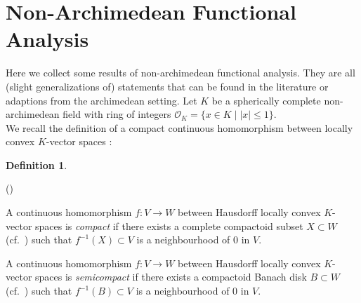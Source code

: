 \documentclass[a4paper, reqno, 10pt]{amsart}
\theoremstyle{definition}
\newtheorem{definition}[theorem]{Definition}
\newenvironment{altenumerate}
	{\begin{list}
		{\textup{(\theenumi)} }
		{\usecounter{enumi}
			\setlength{\labelwidth}{0pt}
			\setlength{\labelsep}{0pt}
			\setlength{\leftmargin}{0pt}
			\setlength{\itemsep}{0pt}
			\setlength{\topsep}{0pt}
		\renewcommand{\theenumi}{\roman{enumi}}
		}}
	{\end{list}}
\numberwithin{equation}{section}
\newcommand{\abs}[1]{{\lvert{#1}\rvert}}
\newcommand{\botimes}[1]{{\,\otimes_{#1}\,}}
\newcommand{\cotimes}[1]{{\,\widehat{\otimes}_{#1}\,}}
\newcommand{\Ind}{{\mathrm{Ind}}}
\newcommand{\lra}{\longrightarrow}
\newcommand{\ra}{\rightarrow}
\newcommand{\BN}{{\mathbb {N}}}
\newcommand{\CF}{{\mathcal {F}}}
\newcommand{\CO}{{\mathcal {O}}}
\newcommand{\bP}{{\mathrm{\bf P}}}
\newcommand{\Fd}{{\mathfrak {d}}}
\newcommand{\Fu}{{\mathfrak {u}}}
\begin{document}


















\vspace{3ex}


\appendix


\section{Non-Archimedean Functional Analysis}


Here we collect some results of non-archimedean functional analysis. 
They are all (slight generalizations of) statements that can be found in the literature or adaptions from the archimedean setting.
Let $K$ be a spherically complete non-archimedean field with ring of integers $\CO_K= \{x \in K\mid \abs{x}\leq 1 \}$.
\\





We recall the definition of a compact continuous homomorphism between locally convex $K$-vector spaces \cite[Ch.\ 8.8 p.\ 334]{PerezGarciaSchikhof10LocConvSpNonArch}:

\begin{definition}
	\begin{altenumerate}
		\item
		A continuous homomorphism $f\colon V \ra W$ between Hausdorff locally convex $K$-vector spaces is \textit{compact} if there exists a complete compactoid subset $X \subset W$ (cf.\ \cite[Def.\ 3.8.1]{PerezGarciaSchikhof10LocConvSpNonArch}) such that $f^{-1}(X)\subset V$ is a neighbourhood of $0$ in $V$.
		\item
		A continuous homomorphism $f\colon V \ra W$ between Hausdorff locally convex $K$-vector spaces is \textit{semicompact} if there exists a compactoid Banach disk $B \subset W$ (cf.\ \cite[p. 414]{PerezGarciaSchikhof10LocConvSpNonArch}) such that $f^{-1}(B)\subset V$ is a neighbourhood of $0$ in $V$.
	\end{altenumerate}
	
\end{definition}
\end{document}
